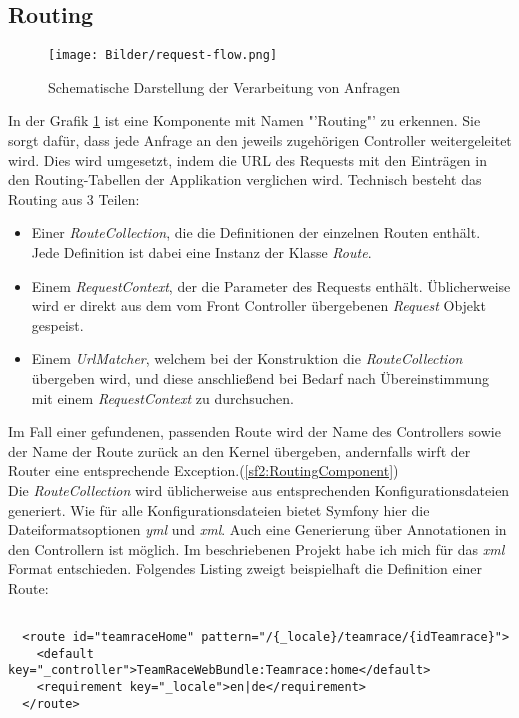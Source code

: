 \documentclass[12pt]{report}
\begin{document}
\subsection{Routing}

\begin{figure}[htp]
\centering
\texttt{[image: Bilder/request-flow.png]}
\caption{Schematische Darstellung der Verarbeitung von Anfragen \cite{sf2:HTTPFundamentals}}
\label{fig:RequestFlow}
\end{figure}
In der Grafik \ref{fig:RequestFlow} ist eine Komponente mit Namen "'Routing"' zu erkennen. Sie sorgt dafür, dass jede Anfrage an den jeweils zugehörigen Controller weitergeleitet wird. Dies wird umgesetzt, indem die URL des Requests mit den Einträgen in den Routing-Tabellen der Applikation verglichen wird. Technisch besteht das Routing aus 3 Teilen: 

\begin{itemize}
\item{Einer \emph{RouteCollection}, die die Definitionen der einzelnen Routen enthält. Jede Definition ist dabei eine Instanz der Klasse \emph{Route}}.
\item{Einem \emph{RequestContext}, der die Parameter des Requests enthält. Üblicherweise wird er direkt aus dem vom Front Controller übergebenen \emph{Request} Objekt gespeist.}
\item{Einem \emph{UrlMatcher}, welchem bei der Konstruktion die \emph{RouteCollection} übergeben wird, und diese anschließend bei Bedarf nach Übereinstimmung mit einem \emph{RequestContext} zu durchsuchen.}
\end{itemize}

Im Fall einer gefundenen, passenden Route wird der Name des Controllers sowie der Name der Route zurück an den Kernel übergeben, andernfalls wirft der Router eine entsprechende Exception.(\ref{sf2:RoutingComponent})\\

Die \emph{RouteCollection} wird üblicherweise aus entsprechenden Konfigurationsdateien generiert. Wie für alle Konfigurationsdateien bietet Symfony hier die Dateiformatsoptionen \emph{yml} und \emph{xml}. Auch eine Generierung über Annotationen in den Controllern ist möglich. Im beschriebenen Projekt habe ich mich für das \emph{xml} Format entschieden. Folgendes Listing zweigt beispielhaft die Definition einer Route:

\begin{lstlisting}

  <route id="teamraceHome" pattern="/{_locale}/teamrace/{idTeamrace}">
    <default key="_controller">TeamRaceWebBundle:Teamrace:home</default>
    <requirement key="_locale">en|de</requirement>
  </route>
  
\end{lstlisting}
  
\end{document}
